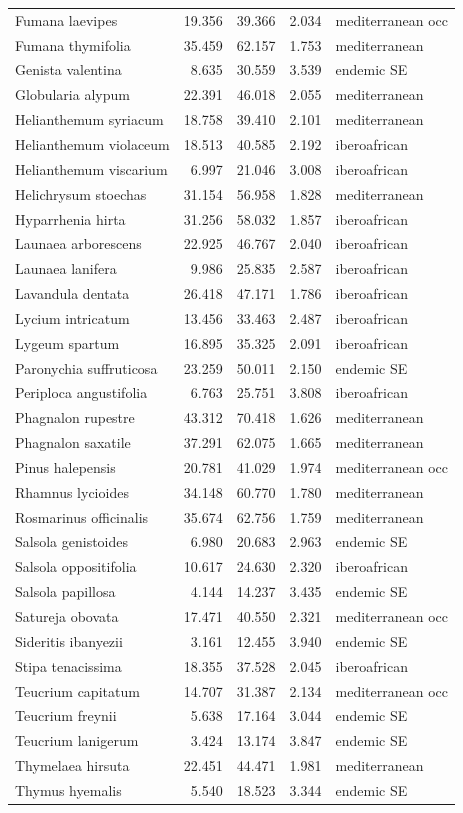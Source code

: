 \documentclass[11pt,twoside]{reedthesis}
\begin{document}
\begin{longtable}[t]{lrrrl}
Fumana laevipes & 19.356 & 39.366 & 2.034 & mediterranean occ\\
Fumana thymifolia & 35.459 & 62.157 & 1.753 & mediterranean\\
Genista valentina & 8.635 & 30.559 & 3.539 & endemic SE\\
Globularia alypum & 22.391 & 46.018 & 2.055 & mediterranean\\
Helianthemum syriacum & 18.758 & 39.410 & 2.101 & mediterranean\\
Helianthemum violaceum & 18.513 & 40.585 & 2.192 & iberoafrican\\
Helianthemum viscarium & 6.997 & 21.046 & 3.008 & iberoafrican\\
Helichrysum stoechas & 31.154 & 56.958 & 1.828 & mediterranean\\
Hyparrhenia hirta & 31.256 & 58.032 & 1.857 & iberoafrican\\
Launaea arborescens & 22.925 & 46.767 & 2.040 & iberoafrican\\
Launaea lanifera & 9.986 & 25.835 & 2.587 & iberoafrican\\
Lavandula dentata & 26.418 & 47.171 & 1.786 & iberoafrican\\
Lycium intricatum & 13.456 & 33.463 & 2.487 & iberoafrican\\
Lygeum spartum & 16.895 & 35.325 & 2.091 & iberoafrican\\
Paronychia suffruticosa & 23.259 & 50.011 & 2.150 & endemic SE\\
Periploca angustifolia & 6.763 & 25.751 & 3.808 & iberoafrican\\
Phagnalon rupestre & 43.312 & 70.418 & 1.626 & mediterranean\\
Phagnalon saxatile & 37.291 & 62.075 & 1.665 & mediterranean\\
Pinus halepensis & 20.781 & 41.029 & 1.974 & mediterranean occ\\
Rhamnus lycioides & 34.148 & 60.770 & 1.780 & mediterranean\\
Rosmarinus officinalis & 35.674 & 62.756 & 1.759 & mediterranean\\
Salsola genistoides & 6.980 & 20.683 & 2.963 & endemic SE\\
Salsola oppositifolia & 10.617 & 24.630 & 2.320 & iberoafrican\\
Salsola papillosa & 4.144 & 14.237 & 3.435 & endemic SE\\
Satureja obovata & 17.471 & 40.550 & 2.321 & mediterranean occ\\
Sideritis ibanyezii & 3.161 & 12.455 & 3.940 & endemic SE\\
Stipa tenacissima & 18.355 & 37.528 & 2.045 & iberoafrican\\
Teucrium capitatum & 14.707 & 31.387 & 2.134 & mediterranean occ\\
Teucrium freynii & 5.638 & 17.164 & 3.044 & endemic SE\\
Teucrium lanigerum & 3.424 & 13.174 & 3.847 & endemic SE\\
Thymelaea hirsuta & 22.451 & 44.471 & 1.981 & mediterranean\\
Thymus hyemalis & 5.540 & 18.523 & 3.344 & endemic SE\\*
\end{longtable}
\end{document}

